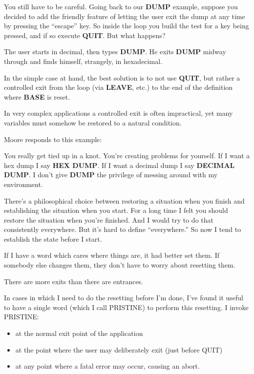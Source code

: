 You still have to be careful. Going back to our \textbf{DUMP} example, suppose
you decided to add the friendly feature of letting the user exit the
dump at any time by pressing the ``escape'' key. So inside the loop you
build the test for a key being pressed, and if so execute \textbf{QUIT}. But what
happens?

The user starts in decimal, then types \textbf{DUMP}. He exits \textbf{DUMP} midway
through and finds himself, strangely, in hexadecimal.

In the simple case at hand, the best solution is to not use
\textbf{QUIT}, but rather a controlled exit from the loop (via
\textbf{LEAVE}, etc.) to the end of the definition where
\textbf{BASE} is reset.

In very complex applications a controlled exit is often impractical,
yet many variables must somehow be restored to a natural condition.

\begin{interview}
Moore responds to this example:

\begin{tfquot}
You really get tied up in a knot. You're creating problems for yourself. If I
want a hex dump I say \textbf{HEX DUMP}. If I want a decimal dump I say
\textbf{DECIMAL DUMP}. I don't give \textbf{DUMP} the privilege of messing around
with my environment.

There's a philosophical choice between restoring a situation when you
finish and establishing the situation when you start. For a long time I felt
you should restore the situation when you're finished. And I would try to
do that consistently everywhere. But it's hard to define ``everywhere.'' So
now I tend to establish the state before I start.

If I have a word which cares where things are, it had better set them. If
somebody else changes them, they don't have to worry about resetting
them.

There are more exits than there are entrances.
\end{tfquot}
\end{interview}

In cases in which I need to do the resetting before I'm done, I've found it
useful to have a single word (which I call PRISTINE) to perform this
resetting. I invoke PRISTINE:

\begin{itemize}
\item at the normal exit point of the application
\item at the point where the user may deliberately exit (just before QUIT)
\item at any point where a fatal error may occur, causing an abort.
\end{itemize}


